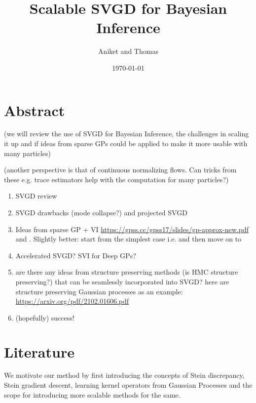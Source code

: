 \documentclass[12pt]{article}
\title{Scalable SVGD for Bayesian Inference}
\author{Aniket and Thomas}
\date{\today}
\renewcommand{\[}{\left[}
\renewcommand{\]}{\right]}
\renewcommand{\(}{\left(}
\renewcommand{\)}{\right)}
\begin{document}
\maketitle

\section{Abstract}




(we will review the use of SVGD for Bayesian Inference, the challenges in scaling it up and if ideas from sparse GPs could be applied to make it more usable with many particles)

(another perspective is that of continuous normalizing flows. Can tricks from these e.g. trace estimators help with the computation for many particles?)

\begin{enumerate}
    \item SVGD review \cite{liu_short_2016,liu_kernelized_2016,liu_stein_2019}

    \item SVGD drawbacks (mode collapse?) and projected SVGD \cite{chen_projected_2020}

    \item Ideas from sparse GP + VI \url{https://gpss.cc/gpss17/slides/gp-approx-new.pdf} and \cite{noack_unifying_2023}. Slightly better: start from the simplest case i.e. \cite{snelson_sparse_2005} and then move on to \cite{titsias_variational_2009,titsias_bayesian_2010}

    \item Accelerated SVGD? SVI for Deep GPs? \cite{hoffman_stochastic_2013}

    \item are there any ideas from structure preserving methods (is HMC structure preserving?) that can be seamlessly incorporated into SVGD? here are structure preserving Gaussian processes as an example: \url{https://arxiv.org/pdf/2102.01606.pdf}
    
    \item (hopefully) success!
\end{enumerate}

\section{Literature}
We motivate our method by first introducing the concepts of Stein discrepancy, Stein gradient descent, learning kernel operators from Gaussian Processes and the scope for introducing more scalable methods for the same. 
\end{document}
